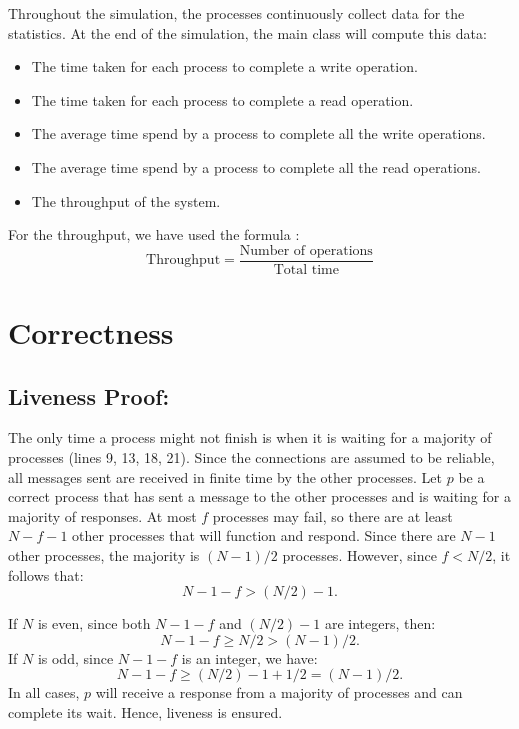 \documentclass{article}
\begin{document}
Throughout the simulation, the processes continuously collect data for
the statistics. At the end of the simulation, the main class will compute this data:

\begin{itemize}
    \item The time taken for each process to complete a write operation.
    \item The time taken for each process to complete a read operation.
    \item The average time spend by a process to complete all the write operations.
    \item The average time spend by a process to complete all the read operations.
    \item The throughput of the system.
\end{itemize}

For the throughput, we have used the formula :
$$
\text{Throughput} = \frac{\text{Number of operations}}{\text{Total time}}
$$

\newpage
\section{Correctness}

\subsection{Liveness Proof:}
The only time a process might not finish is when it is waiting for a majority of processes (lines 9, 13, 18, 21). Since the connections are assumed to be reliable, all messages sent are received in finite time by the other processes. Let $p$ be a correct process that has sent a message to the other processes and is waiting for a majority of responses. At most $f$ processes may fail, so there are at least $N - f - 1$ other processes that will function and respond. Since there are $N - 1$ other processes, the majority is $(N - 1)/2$ processes. However, since $f < N/2$, it follows that:
\[
N - 1 - f > (N / 2) - 1.
\]

If $N$ is even, since both $N - 1 - f$ and $(N / 2) - 1$ are integers, then:
\[
N - 1 - f \geq N / 2 > (N - 1) / 2.
\]
If $N$ is odd, since $N - 1 - f$ is an integer, we have:
\[
N - 1 - f \geq (N / 2) - 1 + 1/2 = (N - 1) / 2.
\]
In all cases, $p$ will receive a response from a majority of processes and can complete its wait. Hence, liveness is ensured.
\end{document}
